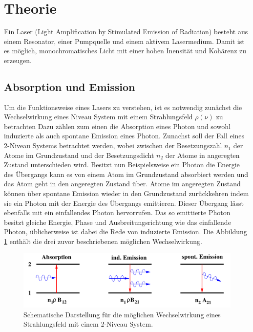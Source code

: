 \section{Theorie}
\label{sec:Theorie}
Ein Laser (Light Amplification by
Stimulated Emission of Radiation)
besteht aus einem Resonator,
einer Pumpquelle und einem aktivem Lasermedium.
Damit ist es möglich, monochromatisches Licht mit einer
hohen Inensität und Kohärenz zu erzeugen.

\subsection{Absorption und Emission}
\label{subsec:absorption_und_emission}
Um die Funktionsweise eines Lasers
zu verstehen, ist es notwendig zunächst
die Wechselwirkung eines Niveau System
mit einem Strahlungsfeld $\rho(\nu)$ zu betrachten
Dazu zählen zum einen die Absorption eines Photon
und sowohl induzierte als auch spontane Emission eines Photon.
Zunachst soll der Fall
eines 2-Niveau Systems betrachtet
werden, wobei zwischen der Besetzungszahl $n_1$
der Atome im Grundzustand
und der Besetzungsdicht $n_2$
der Atome in angeregten
Zustand unterschieden wird.
Besitzt nun Beispielsweise ein
Photon die Energie des Übergangs
kann es von einem Atom im Grundzustand
absorbiert werden und das Atom geht in den
angeregten Zustand über. Atome im angeregten
Zustand können über spontane Emission
wieder in den Grundzustand zurückkehren
indem sie ein Photon mit der Energie
des Übergangs emittieren.
Dieser Übergang lässt ebenfalls
mit ein einfallendes
Photon hervorrufen.
Das so emittierte Photon besitzt gleiche
Energie, Phase und Ausbreitungsrichtung
wie das einfallende Photon,
üblicherweise ist dabei die Rede von
induzierte Emission.
Die Abbildung \ref{fig:ab_em} enthält die drei
zuvor beschriebenen möglichen Wechselwirkung.
\begin{figure}
  \centering
  \includegraphics{figures/ab_und_emiss.PNG}
  \caption{Schematische Darstellung
  für die möglichen Wechselwirkung
   eines Strahlungsfeld
  mit einem 2-Niveau System. \cite{sample}}
  \label{fig:ab_em}
\end{figure}

